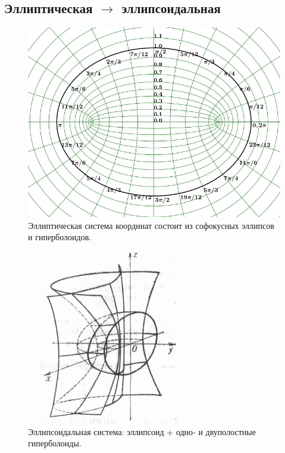 \documentclass[12pt]{report}
\begin{document}
 \subsection{Эллиптическая $\to$ эллипсоидальная}
\begin{figure}[h]\centering
 	\includegraphics[width=.8\linewidth]{elliptical_coordinates}
 	\caption{Эллиптическая система координат состоит из софокусных эллипсов и гиперболоидов.}
\end{figure}
\begin{figure}[h]\centering
 	\includegraphics[height=.35\paperheight]{ellipsoidal_cs}
 	\caption{Эллипсоидальная система: эллипсоид + одно- и двуполостные гиперболоиды.}
\end{figure}
\end{document}
